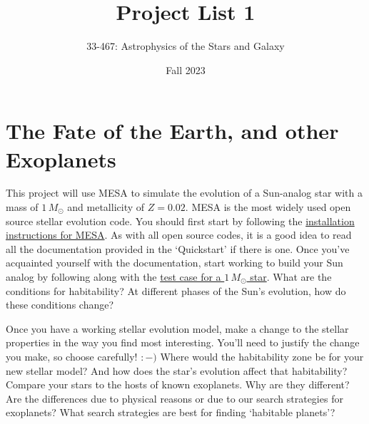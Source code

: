 \documentclass[10pt]{extarticle}
\title{Project List 1}
\author{33-467: Astrophysics of the Stars and Galaxy}
\date{Fall 2023}
\begin{document}
\maketitle


\begin{tcolorbox}[enhanced,
    fonttitle=\fontsize{20}{24}\sffamily\bfseries\selectfont, coltitle=black,
    fontupper=\sffamily, interior style={left color=tcol_CNT1!80,right
    color=tcol_CNT2!80}, frame style={left color=tcol_CNT1!60!black,right
    color=tcol_CNT2!60!black}, attach boxed title to top center={yshift=10pt},
    boxed title style={frame hidden, interior style={left color=tcol_CNT1,right
    color=tcol_CNT2}, frame style={left color=tcol_CNT1!60!black,right
    color=tcol_CNT2!60!black}, height=24pt,bean arc,drop fuzzy shadow },
    top=2mm,bottom=2mm,left=2mm,right=2mm, before skip=20mm,after skip=20mm,
    drop fuzzy shadow,breakable]
%
\makeatletter
{}
\makeatother
\end{tcolorbox}


\section{The Fate of the Earth, and other Exoplanets}
This project will use MESA to simulate the evolution of a Sun-analog star with a
mass of $1\,M_{\odot}$ and metallicity of $Z=0.02$. MESA is the most widely used
open source stellar evolution code. You should first start by following the
\href{https://docs.mesastar.org/en/release-r23.05.1/quickstart.html#installation}{installation
instructions for MESA}. As with all open source codes, it is a good idea to read
all the documentation provided in the `Quickstart' if there is one. Once you've
acquainted yourself with the documentation, start working to build your Sun
analog by following along with the
\href{https://docs.mesastar.org/en/release-r23.05.1/test_suite/1M_pre_ms_to_wd.html#m-pre-ms-to-wd}{test
case for a $1\,M_{\odot}$ star}. What are the conditions for habitability? At
different phases of the Sun's evolution, how do these conditions change? 

Once you have a working stellar evolution model, make a change to the stellar
properties in the way you find most interesting. You'll need to justify the
change you make, so choose carefully! $:-)$ Where would the habitability zone be
for your new stellar model? And how does the star's evolution affect that
habitability? Compare your stars to the hosts of known exoplanets. Why are they
different? Are the differences due to physical reasons or due to our search
strategies for exoplanets? What search strategies are best for finding
`habitable planets'?
\end{document}

